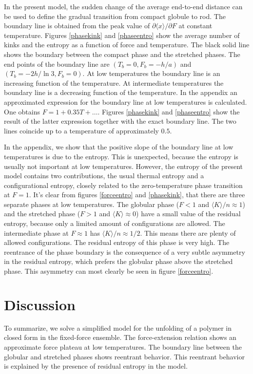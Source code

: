 \documentclass[doublecol,figures]{epl2}
\begin{document}
In the present model, the sudden change of the average end-to-end distance can
be used to define the gradual transition from compact globule to rod. The boundary line is obtained from the peak value of $\partial\langle x\rangle/\partial F$ at constant temperature. Figures \ref{phasekink} and \ref{phaseentro} show the average number of kinks and the entropy as a function of force and temperature. The black solid line shows the boundary between the compact phase and the stretched
phases. The end points of the boundary line are $(T_b=0,F_b=-h/a)$ and
$(T_b=-2h/\ln3,F_b=0)$. At low temperatures the boundary line is an increasing
function of the temperature. At intermediate temperatures the boundary line is a
decreasing function of the temperature. In the appendix an
approximated expression for the boundary line at low temperatures is calculated.
One obtains $F=1+0.35T+\ldots$. Figures \ref{phasekink} and \ref{phaseentro} show  the result of the
latter expression together with the exact boundary line. The two lines coincide
up to a temperature of approximately $0.5$. 

In the appendix, we show that the positive slope of the boundary line
at low temperatures is due to the entropy. This is unexpected, because the
entropy is usually not important at low temperatures. However, the entropy of
the present model contains two contributions, the usual thermal entropy and a
configurational entropy, closely related to the zero-temperature phase
transition at $F=1$. It's clear from figures \ref{forceentro} and
\ref{phasekink}, that there are three separate phases at low temperatures. The
globular phase ($F<1$ and $\langle K\rangle/n\approx1$) and the stretched phase
($F>1$ and $\langle K\rangle\approx0$) have a small value of the residual
entropy, because only a limited amount of configurations are allowed. The
intermediate phase at $F\approx1$ has $\langle K\rangle/n\approx 1/2$. This
means there are plenty of allowed configurations. The residual entropy of this
phase is very high. The reentrance of the phase boundary is the consequence of a
very subtle asymmetry in the residual entropy, which prefers the globular phase
above the stretched phase. This asymmetry can most clearly be seen in figure
\ref{forceentro}.






\section{Discussion}
To summarize, we solve a simplified model for the unfolding of a polymer in
closed form in the fixed-force ensemble. The force-extension relation shows an
approximate force plateau at low temperatures. The boundary line between the
globular and stretched phases shows reentrant behavior. This reentrant behavior
is explained by the presence of residual entropy in the model.
\end{document}
